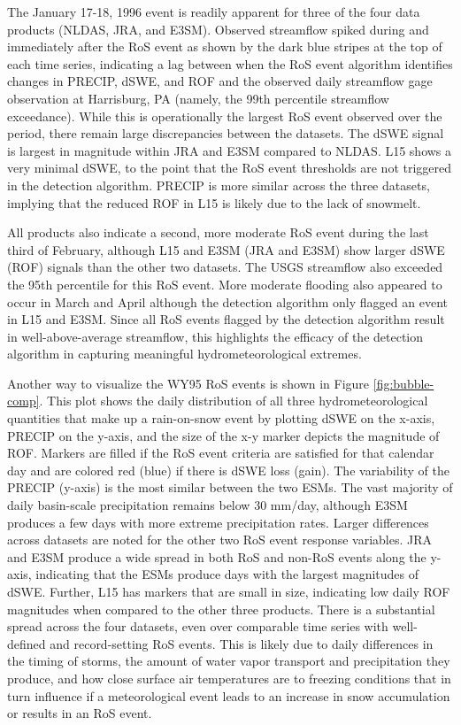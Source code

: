 \documentclass[nhess, manuscript]{copernicus}
\begin{document}
The January 17-18, 1996 event is readily apparent for three of the four data products (NLDAS, JRA, and E3SM).
Observed streamflow spiked during and immediately after the RoS event as shown by the dark blue stripes at the top of each time series, indicating a lag between when the RoS event algorithm identifies changes in PRECIP, dSWE, and ROF and the observed daily streamflow gage observation at Harrisburg, PA (namely, the 99th percentile streamflow exceedance).
While this is operationally the largest RoS event observed over the period, there remain large discrepancies between the datasets.
The dSWE signal is largest in magnitude within JRA and E3SM compared to NLDAS.
L15 shows a very minimal dSWE, to the point that the RoS event thresholds are not triggered in the detection algorithm.
PRECIP is more similar across the three datasets, implying that the reduced ROF in L15 is likely due to the lack of snowmelt.

All products also indicate a second, more moderate RoS event during the last third of February, although L15 and E3SM (JRA and E3SM) show larger dSWE (ROF) signals than the other two datasets.
The USGS streamflow also exceeded the 95th percentile for this RoS event.
More moderate flooding also appeared to occur in March and April although the detection algorithm only flagged an event in L15 and E3SM.
Since all RoS events flagged by the detection algorithm result in well-above-average streamflow, this highlights the efficacy of the detection algorithm in capturing meaningful hydrometeorological extremes.

Another way to visualize the WY95 RoS events is shown in Figure \ref{fig:bubble-comp}.
This plot shows the daily distribution of all three hydrometeorological quantities that make up a rain-on-snow event by plotting dSWE on the x-axis, PRECIP on the y-axis, and the size of the x-y marker depicts the magnitude of ROF.
Markers are filled if the RoS event criteria are satisfied for that calendar day and are colored red (blue) if there is dSWE loss (gain).
The variability of the PRECIP (y-axis) is the most similar between the two ESMs.
The vast majority of daily basin-scale precipitation remains below 30 mm/day, although E3SM produces a few days with more extreme precipitation rates.
Larger differences across datasets are noted for the other two RoS event response variables.
JRA and E3SM produce a wide spread in both RoS and non-RoS events along the y-axis, indicating that the ESMs produce days with the largest magnitudes of dSWE.
Further, L15 has markers that are small in size, indicating low daily ROF magnitudes when compared to the other three products.
There is a substantial spread across the four datasets, even over comparable time series with well-defined and record-setting RoS events.
This is likely due to daily differences in the timing of storms, the amount of water vapor transport and precipitation they produce, and how close surface air temperatures are to freezing conditions that in turn influence if a meteorological event leads to an increase in snow accumulation or results in an RoS event.
\end{document}
